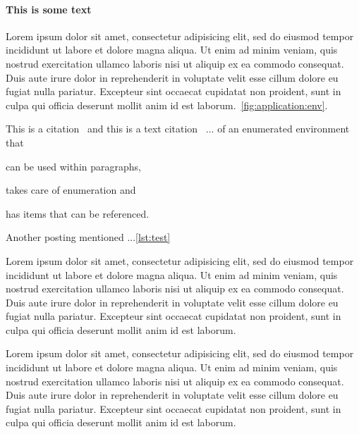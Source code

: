 \documentclass{proposal}
\begin{document}
\paragraph{This is some text}
Lorem ipsum dolor sit amet, consectetur adipisicing elit, sed do eiusmod
tempor incididunt ut labore et dolore magna aliqua. Ut enim ad minim veniam,
quis nostrud exercitation ullamco laboris nisi ut aliquip ex ea commodo
consequat. Duis aute irure dolor in reprehenderit in voluptate velit esse
cillum dolore eu fugiat nulla pariatur. Excepteur sint occaecat cupidatat non
proident, sunt in culpa qui officia deserunt mollit anim id est laborum.~\autoref{fig:application:env}.

This is a citation~\autocite{einstein} and this is a text citation~\textcite{dirac}
... of an enumerated environment that
\begin{linline}
    \item can be used within paragraphs,
    \item takes care of enumeration and
    \item has items that can be referenced.
    \label{lst:test}
\end{linline}
Another posting mentioned ...\autoref{lst:test}

Lorem ipsum dolor sit amet, consectetur adipisicing elit, sed do eiusmod
tempor incididunt ut labore et dolore magna aliqua. Ut enim ad minim veniam,
quis nostrud exercitation ullamco laboris nisi ut aliquip ex ea commodo
consequat. Duis aute irure dolor in reprehenderit in voluptate velit esse
cillum dolore eu fugiat nulla pariatur. Excepteur sint occaecat cupidatat non
proident, sunt in culpa qui officia deserunt mollit anim id est laborum.

Lorem ipsum dolor sit amet, consectetur adipisicing elit, sed do eiusmod
tempor incididunt ut labore et dolore magna aliqua. Ut enim ad minim veniam,
quis nostrud exercitation ullamco laboris nisi ut aliquip ex ea commodo
consequat. Duis aute irure dolor in reprehenderit in voluptate velit esse
cillum dolore eu fugiat nulla pariatur. Excepteur sint occaecat cupidatat non
proident, sunt in culpa qui officia deserunt mollit anim id est laborum.

\printbibliography
\end{document}
